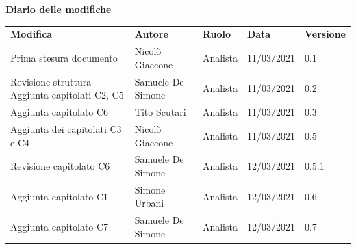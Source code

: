 \documentclass[a4paper]{article}
\begin{document}
    \begin{center}

        \textbf{\Large Diario delle modifiche}\\
        \vspace{10px}
        \begin{table}[h!]
        \centering
        \renewcommand{\arraystretch}{1.8}
        \begin{tabular}{p{150px} p{90px} p{50px} p{60px} p{45px}}
            \rowcolor{logo!70} \textbf{Modifica} & \textbf{Autore} & \textbf{Ruolo} & \textbf{Data} & \textbf{Versione}\\
            Prima stesura documento & Nicolò Giaccone & Analista & 11/03/2021 & 0.1\\
            Revisione struttura \newline Aggiunta capitolati C2, C5 & Samuele De Simone & Analista & 11/03/2021 & 0.2\\
            Aggiunta capitolato C6 & Tito Scutari & Analista & 11/03/2021 & 0.3 \\
            Aggiunta dei capitolati C3 e C4 & Nicolò Giaccone & Analista & 11/03/2021 & 0.5\\
            Revisione capitolato C6 & Samuele De Simone & Analista & 12/03/2021 & 0.5.1 \\
            Aggiunta capitolato C1 & Simone Urbani & Analista & 12/03/2021 & 0.6 \\
            Aggiunta capitolato C7 & Samuele De Simone& Analista & 12/03/2021 & 0.7 \\
        \end{tabular}
    \end{table}
    \end{center}
    \newpage
\tableofcontents
\newpage








\end{document}
